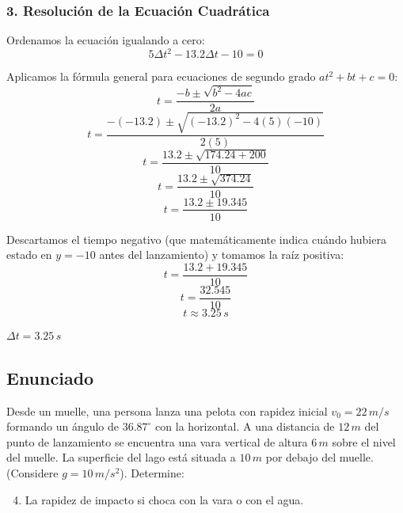 \documentclass[12pt, a4paper]{article}
\begin{document}
\subsubsection*{3. Resolución de la Ecuación Cuadrática}
Ordenamos la ecuación igualando a cero:
$$ 5 \Delta t^2 - 13.2 \Delta t - 10 = 0 $$

Aplicamos la fórmula general para ecuaciones de segundo grado $at^2 + bt + c = 0$:
$$ t = \frac{-b \pm \sqrt{b^2 - 4ac}}{2a} $$
$$ t = \frac{-(-13.2) \pm \sqrt{(-13.2)^2 - 4(5)(-10)}}{2(5)} $$
$$ t = \frac{13.2 \pm \sqrt{174.24 + 200}}{10} $$
$$ t = \frac{13.2 \pm \sqrt{374.24}}{10} $$
$$ t = \frac{13.2 \pm 19.345}{10} $$

Descartamos el tiempo negativo (que matemáticamente indica cuándo hubiera estado en $y=-10$ antes del lanzamiento) y tomamos la raíz positiva:
$$ t = \frac{13.2 + 19.345}{10} $$
$$ t = \frac{32.545}{10} $$
$$ t \approx 3.25 \, \si{s} $$

\begin{tcolorbox}[colback=green!5!white, colframe=green!50!black, title=Respuesta Final]
\centering $\Delta t = 3.25 \, \si{s}$
\end{tcolorbox}

\newpage

\subsection*{Enunciado}
Desde un muelle, una persona lanza una pelota con rapidez inicial $v_0 = 22 \, \si{m/s}$ formando un ángulo de $36.87^\circ$ con la horizontal. A una distancia de $12 \, \si{m}$ del punto de lanzamiento se encuentra una vara vertical de altura $6 \, \si{m}$ sobre el nivel del muelle. La superficie del lago está situada a $10 \, \si{m}$ por debajo del muelle. (Considere $g = 10 \, \si{m/s^2}$). Determine:
\begin{enumerate}[label=\alph*)]
    \setcounter{enumi}{3}
    \item La rapidez de impacto si choca con la vara o con el agua.
\end{enumerate}
\end{document}
